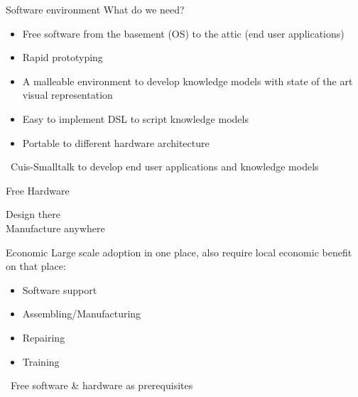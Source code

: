 \documentclass{beamer}
\newcommand{\tip}{\boldmath{\textcolor{red}{$\Rightarrow$}}}
\begin{document}
\begin{frame}{Software environment}
  What do we need?

  \vspace{10pt}
  
  \begin{itemize}
  \item Free software from the basement (OS) to the attic (end user
    applications)
  \item Rapid prototyping
  \item A malleable environment to develop knowledge models with state
    of the art visual representation
  \item Easy to implement DSL to script knowledge models
  \item Portable to different hardware architecture
  \end{itemize}

  \vspace*{10pt}

  \tip\ Cuis-Smalltalk to develop end user applications and knowledge
  models
\end{frame}
%
\begin{frame}{Free Hardware}
  \fontsize{14pt}{8pt}\selectfont
  \begin{center}
    Design there\\
    \vspace*{10pt}
    Manufacture anywhere
  \end{center}
\end{frame}

\begin{frame}{Economic}
  Large scale adoption in one place, also require local economic
  benefit on that place:
  \begin{itemize}
  \item Software support
  \item Assembling/Manufacturing
  \item Repairing
  \item Training
  \end{itemize}

  \vspace*{10pt}
  
  \tip\ Free software \& hardware as prerequisites
  
\end{frame}
\end{document}
